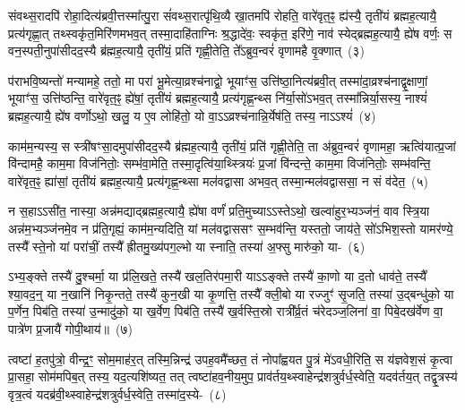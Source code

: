 संवथ्स॒रादपि॑ रोहा॒दित्य॑ब्रवी॒त्तस्मा᳚त्पु॒रा सं॑वथ्स॒रात्पृ॑थि॒व्यै खा॒तमपि॑ रोहति॒ वारे॑वृत॒ꣴ॒ ह्य॑स्यै॒ तृती॑यं ब्रह्मह॒त्यायै॒ प्रत्य॑\-गृह्णा॒त् तथ्स्वकृ॑त॒मिरि॑णमभव॒त् तस्मा॒दाहि॑ताग्निः श्र॒द्धादे॑वः॒ स्वकृ॑त॒ इरि॑णे॒ नाव॑ स्येद्ब्रह्मह॒त्यायै॒ ह्ये॑ष वर्णः॒ स वन॒स्पती॒नुपा॑सीदद॒स्यै ब्र॑ह्मह॒त्यायै॒ तृती॑यं॒ प्रति॑ गृह्णी॒तेति॒ ते᳚\-ऽब्रुव॒न्वरं॑ वृणामहै वृ॒क्णात्~(३)

प॑राभवि॒ष्यन्तो॑ मन्यामहे॒ ततो॒ मा परा॑ भू॒मेत्या॒व्रश्च॑नाद्वो॒ भूयाꣳ॑स॒ उत्ति॑ष्ठा॒नित्य॑ब्रवी॒त् तस्मा॑दा॒व्रश्च॑नाद्वृ॒क्षाणां॒ भूयाꣳ॑स॒ उत्ति॑ष्ठन्ति॒ वारे॑वृत॒ꣴ॒ ह्ये॑षां॒ तृती॑यं ब्रह्मह॒त्यायै॒ प्रत्य॑\-गृह्ण॒न्थ्स नि॑र्या॒सो॑\-ऽभव॒त् तस्मा᳚न्निर्या॒सस्य॒ नाश्यं॑ ब्रह्मह॒त्यायै॒ ह्ये॑ष वर्णो\-ऽथो॒ खलु॒ य ए॒व लोहि॑तो॒ यो वा॒\-ऽऽ\-व्रश्च॑नान्नि॒र्येष॑ति॒ तस्य॒ ना\-ऽऽ\-श्यं॑~(४)

काम॑म॒न्यस्य॒ स स्त्री॑षꣳसा॒दमुपा॑सीदद॒स्यै ब्र॑ह्मह॒त्यायै॒ तृती॑यं॒ प्रति॑ गृह्णी॒तेति॒ ता अ॑ब्रुव॒न्वरं॑ वृणामहा॒ ऋत्वि॑यात्प्र॒जां वि॑न्दामहै॒ काम॒मा विज॑नितोः॒ सम्भ॑वा॒मेति॒ तस्मा॒दृत्वि॑या॒थ्स्त्रियः॑ प्र॒जां वि॑न्दन्ते॒ काम॒मा विज॑नितोः॒ सम्भ॑वन्ति॒ वारे॑वृत॒ꣴ॒ ह्या॑सां॒ तृती॑यं ब्रह्मह॒त्यायै॒ प्रत्य॑\-गृह्ण॒न्थ्सा मल॑वद्वासा अभव॒त् तस्मा॒न्मल॑वद्वाससा॒ न सं व॑देत॒~(५)

न स॒हा\-ऽऽ\-सी॑त॒ नास्या॒ अन्न॑मद्याद्ब्रह्मह॒त्यायै॒ ह्ये॑षा वर्णं॑ प्रति॒मुच्या\-ऽऽ\-स्ते\-ऽथो॒ खल्वा॑हुर॒भ्यञ्ज॑नं॒ वाव स्त्रि॒या अन्न॑म॒भ्यञ्ज॑नमे॒व न प्र॑ति॒गृह्यं॒ काम॑म॒न्यदिति॒ यां मल॑वद्वाससꣳ स॒म्भव॑न्ति॒ यस्ततो॒ जाय॑ते॒ सो॑\-ऽभिश॒स्तो यामर॑ण्ये॒ तस्यै᳚ स्ते॒नो यां परा॑चीं॒ तस्यै᳚ ह्रीतमु॒ख्य॑पग॒ल्भो या स्नाति॒ तस्या॑ अ॒फ्सु मारु॑को॒ या-~(६)

ऽभ्य॒ङ्क्ते तस्यै॑ दु॒श्चर्मा॒ या प्र॑लि॒खते॒ तस्यै॑ खल॒तिर॑पमा॒री या\-ऽऽ\-ङ्क्ते तस्यै॑ का॒णो या द॒तो धाव॑ते॒ तस्यै᳚ श्या॒वद॒न्॒ या न॒खानि॑ निकृ॒न्तते॒ तस्यै॑ कुन॒खी या कृ॒णत्ति॒ तस्यै᳚ क्ली॒बो या रज्जुꣳ॑ सृ॒जति॒ तस्या॑ उ॒द्बन्धु॑को॒ या प॒र्णेन॒ पिब॑ति॒ तस्या॑ उ॒न्मादु॑को॒ या ख॒र्वेण॒ पिब॑ति॒ तस्यै॑ ख॒र्वस्ति॒स्रो रात्री᳚र्व्र॒तं च॑रेदञ्ज॒लिना॑ वा॒ पिबे॒दख॑र्वेण वा॒ पात्रे॑ण प्र॒जायै॑ गोपी॒थाय॑॥~(७)

{\anuvakamend[{यथ्सो॑म॒पान॑न्ते वृ॒क्णात् तस्य॒ नाश्यं॑ वदेत॒ मारु॑को॒ या\-ऽख॑र्वेण वा॒ त्रीणि॑ च}]}%

त्वष्टा॑ ह॒तपु॑त्रो॒ वीन्द्र॒ꣳ॒ सोम॒माह॑र॒त् तस्मि॒न्निन्द्र॑ उपह॒वमै᳚च्छत॒ तं नोपा᳚ह्वयत पु॒त्रं मे॑\-ऽवधी॒रिति॒ स य॑ज्ञवेश॒सं कृ॒त्वा प्रा॒सहा॒ सोम॑मपिब॒त् तस्य॒ यद॒त्यशि॑ष्यत॒ तत् त्वष्टा॑हव॒नीय॒मुप॒ प्राव॑र्तय॒थ्\-स्वाहेन्द्र॑शत्रुर्वर्ध॒स्वेति॒ यदव॑र्तय॒त् तद्वृ॒त्रस्य॑ वृत्र॒त्वं यदब्र॑वी॒थ्\-स्वाहेन्द्र॑शत्रुर्वर्ध॒स्वेति॒ तस्मा॑द॒स्ये-~(८)

